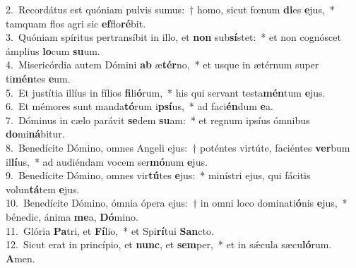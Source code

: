 {2.~}Recordátus est quóniam pulvis sumus:~† homo, sicut fœnum \textbf{di}es \textbf{e}jus,~* tamquam flos agri sic \textbf{ef}flo\textbf{ré}bit.\\
{3.~}Quóniam spíritus pertransíbit in illo, et \textbf{non} sub\textbf{sí}stet:~* et non cognóscet ámplius \textbf{lo}cum \textbf{su}um.\\
{4.~}Misericórdia autem Dómini \textbf{ab} æ\textbf{tér}no,~* et usque in ætérnum super ti\textbf{mén}tes \textbf{e}um.\\
{5.~}Et justítia illíus in fílios \textbf{fi}li\textbf{ó}rum,~* his qui servant testa\textbf{mén}tum \textbf{e}jus.\\
{6.~}Et mémores sunt manda\textbf{tó}rum i\textbf{psí}us,~* ad faci\textbf{én}dum \textbf{e}a.\\
{7.~}Dóminus in cælo parávit \textbf{se}dem \textbf{su}am:~* et regnum ipsíus ómnibus \textbf{do}mi\textbf{ná}bitur.\\
{8.~}Benedícite Dómino, omnes Angeli ejus:~† poténtes virtúte, faciéntes \textbf{ver}bum il\textbf{lí}us,~* ad audiéndam vocem ser\textbf{mó}num \textbf{e}jus.\\
{9.~}Benedícite Dómino, omnes vir\textbf{tú}tes \textbf{e}jus:~* minístri ejus, qui fácitis volun\textbf{tá}tem \textbf{e}jus.\\
{10.~}Benedícite Dómino, ómnia ópera ejus:~† in omni loco dominati\textbf{ó}nis \textbf{e}jus,~* bénedic, ánima \textbf{me}a, \textbf{Dó}mino.\\
{11.~}Glória \textbf{Pa}tri, et \textbf{Fí}lio,~* et Spi\textbf{rí}tui \textbf{San}cto.\\
{12.~}Sicut erat in princípio, et \textbf{nunc}, et \textbf{sem}per,~* et in sǽcula sæcu\textbf{ló}rum. \textbf{A}men.\\
